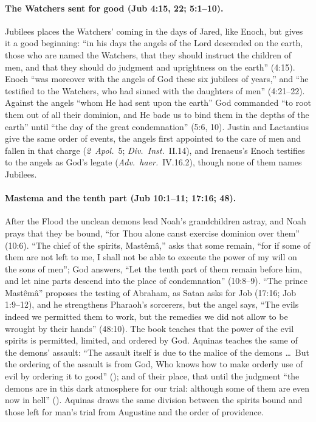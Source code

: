 \paragraph{The Watchers sent for good (Jub 4:15, 22; 5:1--10).} Jubilees
places the Watchers' coming in the days of Jared, like Enoch, but gives it a
good beginning: ``in his days the angels of the Lord descended on the earth,
those who are named the Watchers, that they should instruct the children of
men, and that they should do judgment and uprightness on the earth'' (4:15).
Enoch ``was moreover with the angels of God these six jubilees of years,''
and ``he testified to the Watchers, who had sinned with the daughters of
men'' (4:21--22). Against the angels ``whom He had sent upon the earth''
God commanded ``to root them out of all their dominion, and He bade us to
bind them in the depths of the earth'' until ``the day of the great
condemnation'' (5:6, 10). Justin and Lactantius give the same order of events, the angels first
appointed to the care of men and fallen in that charge (\emph{2~Apol.}\ 5;
\emph{Div.\ Inst.}\ II.14), and Irenaeus's Enoch testifies to the angels as
God's legate (\emph{Adv.\ haer.}\ IV.16.2), though none of them names Jubilees.

\paragraph{Mastema and the tenth part (Jub 10:1--11; 17:16; 48).} After the
Flood the unclean demons lead Noah's grandchildren astray, and Noah prays
that they be bound, ``for Thou alone canst exercise dominion over them''
(10:6). ``The chief of the spirits, Mastêmâ,'' asks that some remain, ``for if some of them are not left to me, I shall not be
able to execute the power of my will on the sons of men''; God answers, ``Let
the tenth part of them remain before him, and let nine parts descend into
the place of condemnation'' (10:8--9). ``The prince Mastêmâ'' proposes the
testing of Abraham, as Satan asks for Job (17:16; Job 1:9--12), and he
strengthens Pharaoh's sorcerers, but the angel says, ``The evils indeed we
permitted them to work, but the remedies we did not allow to be wrought by
their hands'' (48:10). The book teaches that the power of the evil spirits
is permitted, limited, and ordered by God. Aquinas teaches the same of the
demons' assault: ``The assault itself is due to the malice of the demons
\dots\ But the ordering of the assault is from God, Who knows how to make
orderly use of evil by ordering it to good'' (); and of
their place, that until the judgment ``the demons are in this dark
atmosphere for our trial: although some of them are even now in hell''
(). Aquinas draws the same division between the spirits
bound and those left for man's trial from Augustine and the order of
providence.

